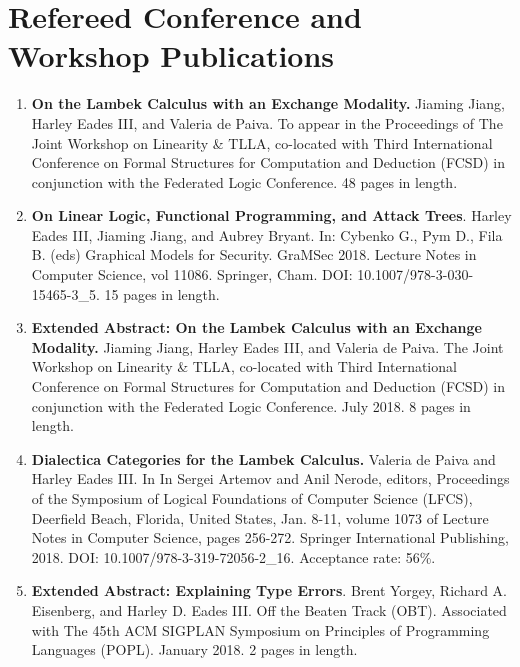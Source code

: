 \documentclass[11pt]{article}
\begin{document}
  \section{Refereed Conference and Workshop Publications}
  \label{subsec:symposium_publications}
  \begin{enumerate}

  \item[] \textbf{On the Lambek Calculus with an Exchange Modality.}
    Jiaming Jiang, Harley Eades III, and Valeria de Paiva. To appear
    in the Proceedings of The Joint Workshop on Linearity \& TLLA,
    co-located with Third International Conference on Formal
    Structures for Computation and Deduction (FCSD) in conjunction
    with the Federated Logic Conference. 48 pages in length.
    
  \item[] \textbf{On Linear Logic, Functional Programming, and Attack
    Trees}. Harley Eades III, Jiaming Jiang, and Aubrey Bryant. In:
    Cybenko G., Pym D., Fila B. (eds) Graphical Models for
    Security. GraMSec 2018. Lecture Notes in Computer Science, vol
    11086. Springer, Cham. DOI: 10.1007/978-3-030-15465-3\_5. 15 pages
    in length.

  \item[] \textbf{Extended Abstract: On the Lambek Calculus with an
    Exchange Modality.}  Jiaming Jiang, Harley Eades III, and Valeria
    de Paiva. The Joint Workshop on Linearity \& TLLA, co-located with
    Third International Conference on Formal Structures for
    Computation and Deduction (FCSD) in conjunction with the Federated
    Logic Conference. July 2018. 8 pages in length.
    
  \item[] \textbf{Dialectica Categories for the Lambek Calculus.}
    Valeria de Paiva and Harley Eades III. In In Sergei Artemov and
    Anil Nerode, editors, Proceedings of the Symposium of Logical
    Foundations of Computer Science (LFCS), Deerfield Beach, Florida,
    United States, Jan. 8-11, volume 1073 of Lecture Notes in Computer
    Science, pages 256-272. Springer International Publishing,
    2018. DOI: 10.1007/978-3-319-72056-2\_16.  Acceptance rate: 56\%.    
    
  \item[] \textbf{Extended Abstract: Explaining Type Errors}.  Brent
    Yorgey, Richard A. Eisenberg, and Harley D. Eades III. Off the
    Beaten Track (OBT). Associated with The 45th ACM SIGPLAN Symposium
    on Principles of Programming Languages (POPL). January 2018. 2
    pages in length.
       

\end{enumerate}
\end{document}
